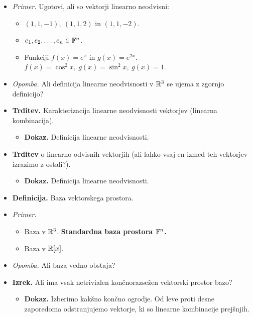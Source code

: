 \begin{enumerate}
\begin{itemize}
        \item \colorbox{yellow!30}{\emph{Primer.}} Ugotovi, ali so vektorji linearno neodvisni:
        \begin{itemize}
            \item $(1,1,-1), \ (1,1,2)$ in $(1, 1, -2)$.
            \item $e_1, e_2, \ldots, e_n \in \mathbb{F}^n$.
            \item Funkciji $f(x) = e^x$ in $g(x) = e^{2x}$. $f(x) = \cos^2 x, \ g(x) = \sin^2 x, \ g(x) = 1$.
        \end{itemize}
        \item \colorbox{yellow!30}{\emph{Opomba.}} Ali definicija linearne neodvisnosti v $\mathbb{R}^3$ se ujema z zgornjo definicijo?
        \item \colorbox{blue!30}{\textbf{Trditev.}} Karakterizacija linearne neodvisnosti vektorjev (linearna kombinacija).
        \begin{itemize}
            \item \colorbox{green!30}{\textbf{Dokaz.}} Definicija linearne neodvisnosti.
        \end{itemize}
        \item \colorbox{blue!30}{\textbf{Trditev}} o linearno odvisnih vektorjih (ali lahko vsaj en izmed teh vektorjev izrazimo z ostali?).
        \begin{itemize}
            \item \colorbox{green!30}{\textbf{Dokaz.}} Definicija linearne neodvisnosti.
        \end{itemize}
        \item \colorbox{purple!30}{\textbf{Definicija.}} Baza vektorskega prostora.
        \item \colorbox{yellow!30}{\emph{Primer.}}       
        \begin{itemize}
            \item Baza v $\mathbb{R}^3$.
            \textbf{Standardna baza prostora $\mathbb{F}^n$.}
            \item Baza v $\mathbb{R}[x]$.
        \end{itemize}
        \item \colorbox{yellow!30}{\emph{Opomba.}} Ali baza vedno obstaja?
        \item \colorbox{blue!30}{\textbf{Izrek.}} Ali ima vsak netrivialen končnorazsežen vektorski prostor bazo?
        \begin{itemize}
            \item \colorbox{green!30}{\textbf{Dokaz.}} Izberimo kakšno končno ogrodje. Od leve proti desne zaporedoma odstranjujemo vektorje, ki so linearne kombinacije prejšnjih.

\end{itemize}
\end{itemize}
\end{enumerate}
